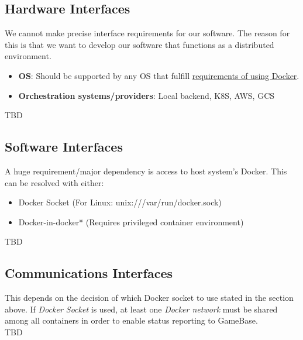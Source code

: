 \documentclass[a4paper,12pt,chapterprefix=false,bibliography=totoc,listof=totoc,]{scrreprt}
\newcommand{\gls}[1]{\uppercase{#1}}
\begin{document}
\subsection{Hardware Interfaces}
We cannot make precise interface requirements for our software. The reason for this is that we want to develop our software that functions as a distributed environment.
\begin{itemize}
	\item \textbf{OS}: Should be supported by any OS that fulfill \href{https://www.docker.com/}{requirements of using Docker}.
	\item \textbf{Orchestration systems/providers}: Local backend, \gls{k8s}, \gls{aws}, \gls{gcs}
\end{itemize}
\gls{tbd}

\subsection{Software Interfaces}
A huge requirement/major dependency is access to host system's Docker. This can be resolved with either:
\begin{itemize}
	\item Docker Socket (For Linux: unix:///var/run/docker.sock)
	\item Docker-in-docker* (Requires privileged container environment)
\end{itemize}
\gls{tbd}

\subsection{Communications Interfaces}
This depends on the decision of which Docker socket to use stated in the section above.
If \textit{Docker Socket} is used, at least one \textit{Docker network} must be shared among all containers in order to enable status reporting to GameBase. \\
\gls{tbd}
\end{document}
